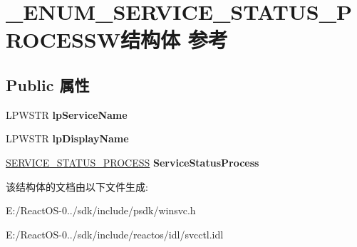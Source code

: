 \hypertarget{struct___e_n_u_m___s_e_r_v_i_c_e___s_t_a_t_u_s___p_r_o_c_e_s_s_w}{}\section{\+\_\+\+E\+N\+U\+M\+\_\+\+S\+E\+R\+V\+I\+C\+E\+\_\+\+S\+T\+A\+T\+U\+S\+\_\+\+P\+R\+O\+C\+E\+S\+S\+W结构体 参考}
\label{struct___e_n_u_m___s_e_r_v_i_c_e___s_t_a_t_u_s___p_r_o_c_e_s_s_w}
\subsection*{Public 属性}
\begin{DoxyCompactItemize}
\item 
\mbox{\label{struct___e_n_u_m___s_e_r_v_i_c_e___s_t_a_t_u_s___p_r_o_c_e_s_s_w_ad3576f2db33169e89a58b0c01c1ab698}} 
L\+P\+W\+S\+TR {\bfseries lp\+Service\+Name}
\item 
\mbox{\label{struct___e_n_u_m___s_e_r_v_i_c_e___s_t_a_t_u_s___p_r_o_c_e_s_s_w_a51780a311982d2935dc521f778f85566}} 
L\+P\+W\+S\+TR {\bfseries lp\+Display\+Name}
\item 
\mbox{\label{struct___e_n_u_m___s_e_r_v_i_c_e___s_t_a_t_u_s___p_r_o_c_e_s_s_w_ae31947eafebed5a3ea3e5dd626053ea6}} 
\hyperlink{struct___s_e_r_v_i_c_e___s_t_a_t_u_s___p_r_o_c_e_s_s}{S\+E\+R\+V\+I\+C\+E\+\_\+\+S\+T\+A\+T\+U\+S\+\_\+\+P\+R\+O\+C\+E\+SS} {\bfseries Service\+Status\+Process}
\end{DoxyCompactItemize}


该结构体的文档由以下文件生成\+:\begin{DoxyCompactItemize}
\item 
E\+:/\+React\+O\+S-\/0../sdk/include/psdk/winsvc.\+h\item 
E\+:/\+React\+O\+S-\/0../sdk/include/reactos/idl/svcctl.\+idl\end{DoxyCompactItemize}
